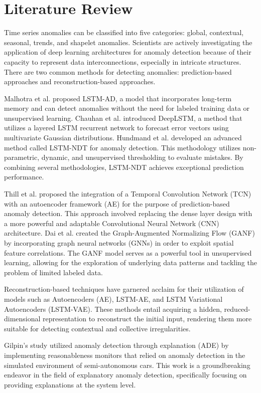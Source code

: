 \documentclass[final,3p,times,twocolumn]{elsarticle}
\begin{document}
\section{Literature Review}\label{sec2}
Time series anomalies can be classified into five categories: global, contextual, seasonal, trends, and shapelet anomalies. Scientists are actively investigating the application of deep learning architectures for anomaly detection because of their capacity to represent data interconnections, especially in intricate structures. There are two common methods for detecting anomalies: prediction-based approaches and reconstruction-based approaches.

Malhotra et al. proposed LSTM-AD, a model that incorporates long-term memory and can detect anomalies without the need for labeled training data or unsupervised learning. Chauhan et al. introduced DeepLSTM, a method that utilizes a layered LSTM recurrent network to forecast error vectors using multivariate Gaussian distributions. Hundmand et al. developed an advanced method called LSTM-NDT for anomaly detection. This methodology utilizes non-parametric, dynamic, and unsupervised thresholding to evaluate mistakes. By combining several methodologies, LSTM-NDT achieves exceptional prediction performance.

Thill et al. proposed the integration of a Temporal Convolution Network (TCN) with an autoencoder framework (AE) for the purpose of prediction-based anomaly detection. This approach involved replacing the dense layer design with a more powerful and adaptable Convolutional Neural Network (CNN) architecture. Dai et al. created the Graph-Augmented Normalizing Flow (GANF) by incorporating graph neural networks (GNNs) in order to exploit spatial feature correlations. The GANF model serves as a powerful tool in unsupervised learning, allowing for the exploration of underlying data patterns and tackling the problem of limited labeled data.

Reconstruction-based techniques have garnered acclaim for their utilization of models such as Autoencoders (AE), LSTM-AE, and LSTM Variational Autoencoders (LSTM-VAE). These methods entail acquiring a hidden, reduced-dimensional representation to reconstruct the initial input, rendering them more suitable for detecting contextual and collective irregularities.

Gilpin's study utilized anomaly detection through explanation (ADE) by implementing reasonableness monitors that relied on anomaly detection in the simulated environment of semi-autonomous cars. This work is a groundbreaking endeavor in the field of explanatory anomaly detection, specifically focusing on providing explanations at the system level.
\end{document}
